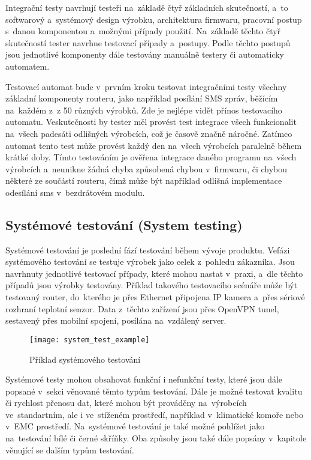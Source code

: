 Integrační testy navrhují testeři na~základě čtyř základních skutečností, a~to softwarový a~systémový design výrobku, architektura firmwaru, pracovní postup s~danou komponentou a~možnými případy použití. Na~základě těchto čtyř skutečností tester navrhne testovací případy a~postupy. Podle těchto postupů jsou jednotlivé komponenty dále testovány manuálně testery či automaticky automatem.

Testovací automat bude v~prvním kroku testovat integračními testy všechny základní komponenty routeru, jako například posílání SMS zpráv, běžícím na~každém z~z 50 různých výrobků. Zde je nejlépe vidět přínos testovacího automatu. Veskutečnosti by tester měl provést test integrace všech funkcionalit na~všech padesáti odlišných výrobcích, což je časově značně náročné. Zatímco automat tento test může provést každý den na~všech výrobcích paralelně během krátké doby. Tímto testováním je ověřena integrace daného programu na~všech výrobcích a~neunikne žádná chyba způsobená chybou v~firmwaru, či chybou některé ze součástí routeru, čímž může být například odlišná implementace odesílání sms v~bezdrátovém modulu.

\subsection{Systémové testování (System testing)}
Systémové testování je poslední fází testování během vývoje produktu. Vefázi systémového testování se testuje výrobek jako celek z~pohledu zákazníka. Jsou navrhnuty jednotlivé testovací případy, které mohou nastat v~praxi, a~dle těchto případů jsou výrobky testovány. Příklad takového testovacího scénáře může být testovaný router, do~kterého je přes Ethernet připojena IP kamera a~přes sériové rozhraní teplotní senzor. Data z~těchto zařízení jsou přes OpenVPN tunel, sestavený přes mobilní spojení, posílána na~vzdálený server.

\begin{figure}[h]
  \centering
  \texttt{[image: system\_test\_example]}
  \caption{Příklad systémového testování}
  \label{fig:system_test_example}
\end{figure}

Systémové testy mohou obsahovat funkční i nefunkční testy, které jsou dále popsané v~sekci věnované těmto typům testování. Dále je možné testovat kvalitu či rychlost přenosu dat, které mohou být prováděny na~výrobcích ve~standartním, ale i ve~stíženém prostředí, například v~klimatické komoře nebo v~EMC prostředí. Na~systémové testování je také možné pohlížet jako na~testování bílé či černé skříňky. Oba způsoby jsou také dále popsány v~kapitole věnující se dalším typům testování.


